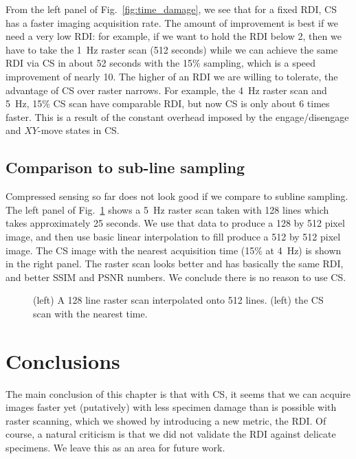 \documentclass[twocolumn,oneside]{IEEEtran/IEEEtran}
\begin{document}
From the left panel of Fig.~\ref{fig:time_damage}, we see that for a fixed RDI,
CS has a faster imaging acquisition rate. The amount of improvement is best if
we need a very low RDI: for example, if we want to hold the RDI below 2, then we
have to take the 1~Hz raster scan (512 seconds) while we can achieve the same
RDI via CS in about 52 seconds with the 15\% sampling, which is a speed
improvement of nearly 10. The higher of an RDI we are willing to tolerate, the
advantage of CS over raster narrows. For example, the 4~Hz raster scan and 5~Hz,
15\% CS scan have comparable RDI, but now CS is only about 6 times faster. This
is a result of the constant overhead imposed by the engage/disengage and
$XY$-move states in CS.

\subsection{Comparison to sub-line sampling}
Compressed sensing so far does not look good if we compare to subline sampling. The left panel of Fig.~\ref{fig:subline} shows a 5~Hz raster scan taken with 128 lines which takes approximately 25 seconds. We use that data to produce a 128 by 512 pixel image, and then use basic linear interpolation to fill produce a 512 by 512 pixel image. The CS image with the nearest acquisition time (15\% at 4~Hz) is shown in the right panel. The raster scan looks better and has basically the same RDI, and better SSIM and PSNR numbers. We conclude there is no reason to use CS.
\begin{figure}
  
  \caption{(left) A 128 line raster scan interpolated onto 512 lines. (left) the CS scan with the nearest time.}
  \label{fig:subline}
\end{figure}

\section{Conclusions}\label{sec:conclusions}
The main conclusion of this chapter is that with CS, it seems that we can
acquire images faster yet (putatively) with less specimen damage than is
possible with raster scanning, which we showed by introducing a new metric, the
RDI. Of course, a natural criticism is that we did not validate the RDI against
delicate specimens. We leave this as an area for future work.








\end{document}
